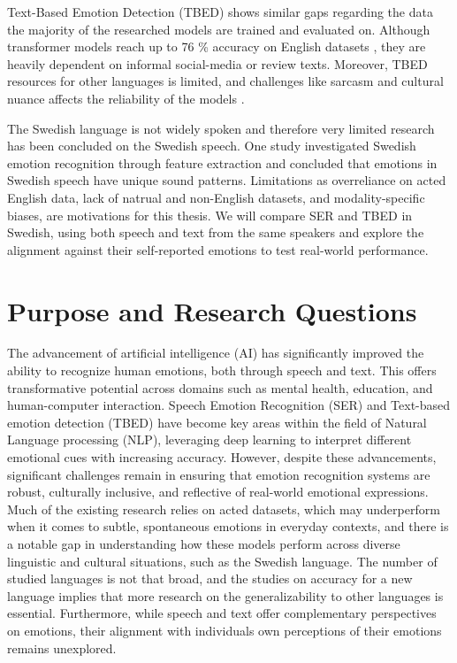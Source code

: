 Text-Based Emotion Detection (TBED) shows similar gaps regarding the data the majority of the researched models are trained and evaluated on. Although transformer models reach up to 76 \% accuracy on
English datasets \autocite{Kusal2023}, they are heavily dependent 
on informal social-media or review texts. Moreover, TBED resources for other languages is limited,  
and challenges like sarcasm and cultural nuance affects the reliability of the models \autocite{Maruf2024,Lee2023}.

\medskip
The Swedish language is not widely spoken and therefore very limited research has been concluded on the Swedish speech. One study \autocite{Ekberg2023} investigated Swedish emotion recognition through feature extraction and concluded that emotions in Swedish speech have unique sound patterns.
Limitations as overreliance on acted English data, lack of natrual and non-English datasets, and modality-specific biases, are motivations for this thesis. We will compare SER and TBED in Swedish, using both speech and text from the same speakers and explore the alignment against their self-reported emotions to test real-world performance. 

\newpage
\section{Purpose and Research Questions}

The advancement of artificial intelligence (AI) has significantly improved the ability to recognize human emotions, both through speech and text. This offers transformative potential across domains such as mental health, education, and human-computer interaction. Speech Emotion Recognition (SER) and Text-based emotion detection (TBED) have become key areas within the field of Natural Language processing (NLP), leveraging deep learning to interpret different emotional cues with increasing accuracy. However, despite these advancements, significant challenges remain in ensuring that emotion recognition systems are robust, culturally inclusive, and reflective of real-world emotional expressions. Much of the existing research relies on acted datasets, which may underperform when it comes to subtle, spontaneous emotions in everyday contexts, and there is a notable gap in understanding how these models perform across diverse linguistic and cultural situations, such as the Swedish language. The number of studied languages is not that broad, and the studies on accuracy for a new language implies that more research on the generalizability to other languages is essential. Furthermore, while speech and text offer complementary perspectives on emotions, their alignment with individuals own perceptions of their emotions remains unexplored. 

